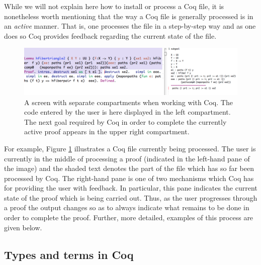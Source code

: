 While we will not explain here how to install or process a Coq file,
it is nonetheless worth mentioning that the way a Coq file is
generally processed is in an \emph{active} manner.  That is, one
processes the file in a step-by-step way and as one does so Coq
provides feedback regarding the current state of the file.
\begin{figure}[H]
\includegraphics[width=4.9in]{screen}
  \caption{A screen with separate compartments when working with
    Coq. The code entered by the user is here displayed in the left
    compartment. The next goal required by Coq in order to complete
    the currently active proof appears in the upper right compartment.}
  \label{fig:diffeo}
\end{figure}
For example, Figure \ref{fig:diffeo} illustrates a Coq file currently
being processed.  The user is currently in the middle of processing a
proof (indicated in the left-hand pane of the image) and the shaded
text denotes the part of the file which has so far been processed by
Coq.  The right-hand pane is one of two mechanisms which Coq has for
providing the user with feedback.  In particular, this pane indicates
the current state of the proof which is being carried out.  Thus, as
the user progresses through a proof the output changes so as to always
indicate what remains to be done in order to complete the proof.
Further, more detailed, examples of this process are given below.

\subsection{Types and terms in Coq}\label{sec:sentences}


